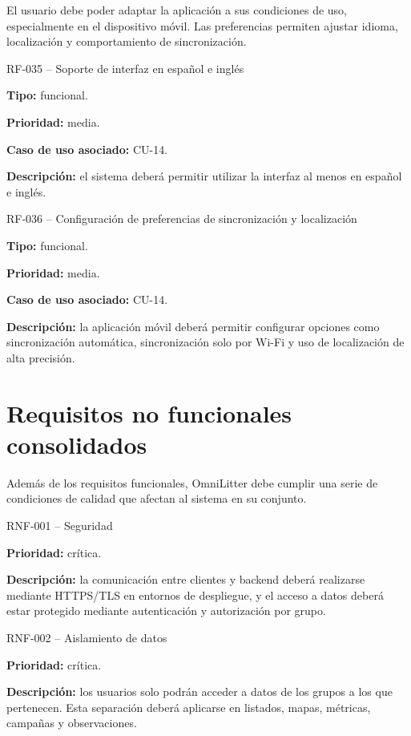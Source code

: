 El usuario debe poder adaptar la aplicación a sus condiciones de uso,
especialmente en el dispositivo móvil. Las preferencias permiten ajustar idioma,
localización y comportamiento de sincronización.

\begin{requisitocard}{RF-035 -- Soporte de interfaz en español e inglés}

\textbf{Tipo:} funcional.

\textbf{Prioridad:} media.

\textbf{Caso de uso asociado:} CU-14.

\textbf{Descripción:} el sistema deberá permitir utilizar la interfaz al menos en
español e inglés.

\end{requisitocard}

\begin{requisitocard}{RF-036 -- Configuración de preferencias de sincronización y localización}

\textbf{Tipo:} funcional.

\textbf{Prioridad:} media.

\textbf{Caso de uso asociado:} CU-14.

\textbf{Descripción:} la aplicación móvil deberá permitir configurar opciones como
sincronización automática, sincronización solo por Wi-Fi y uso de localización de
alta precisión.

\end{requisitocard}

\section{Requisitos no funcionales consolidados}

Además de los requisitos funcionales, OmniLitter debe cumplir una serie de
condiciones de calidad que afectan al sistema en su conjunto.

\begin{requisitocard}{RNF-001 -- Seguridad}

\textbf{Prioridad:} crítica.

\textbf{Descripción:} la comunicación entre clientes y backend deberá realizarse
mediante HTTPS/TLS en entornos de despliegue, y el acceso a datos deberá estar
protegido mediante autenticación y autorización por grupo.

\end{requisitocard}

\begin{requisitocard}{RNF-002 -- Aislamiento de datos}

\textbf{Prioridad:} crítica.

\textbf{Descripción:} los usuarios solo podrán acceder a datos de los grupos a los
que pertenecen. Esta separación deberá aplicarse en listados, mapas, métricas,
campañas y observaciones.

\end{requisitocard}

